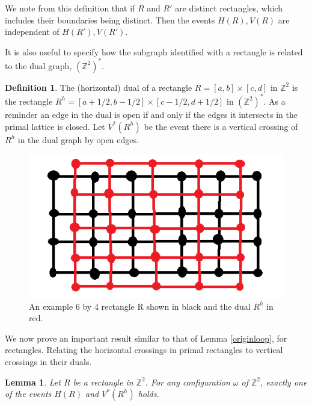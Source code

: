 \documentclass[a4paper,11pt]{article}
\newtheorem{lemma}[theorem]{Lemma}
\theoremstyle{definition}
\newtheorem{definition}[theorem]{Definition}
\newcommand{\ints}{\mathbb{Z}}
\newcommand{\ztwodual}{(\ints^2)^*}
\begin{document}
We note from this definition that if $R$ and $R'$ are distinct rectangles, which includes their boundaries being distinct. Then the events $H(R),V(R)$ are independent of $H(R'),V(R')$.

It is also useful to specify how the subgraph identified with a rectangle is related to the dual graph, $\ztwodual$.
\begin{definition}
	The (horizontal) dual of a rectangle $R = [a,b]\times[c,d]$ in $\ints^2$ is the rectangle $R^h = [a+1/2,b-1/2]\times[c-1/2,d+1/2]$ in $\ztwodual$. As a reminder an edge in the dual is open if and only if the edges it intersects in the primal lattice is closed.
	Let $V^*(R^h)$ be the event there is a vertical crossing of $R^h$ in the dual graph by open edges.
\end{definition}

\begin{figure}
	\centering
	\includegraphics[scale=0.6]{drawings/RectangleDual.png}
	\caption{An example 6 by 4 rectangle R shown in black and the dual $R^h$ in red.}
	\label{fig:rectangle}
\end{figure}

We now prove an important result similar to that of Lemma \ref*{originloop}, for rectangles. Relating the horizontal crossings in primal rectangles to vertical crossings in their duals.

\begin{lemma}\label{rectangleProof}
	Let $R$ be a rectangle in $\ints^2$. For any configuration $\omega$ of $\ints^2$, exactly one of the events $H(R)$ and $V^*(R^h)$ holds.
\end{lemma}
\end{document}
